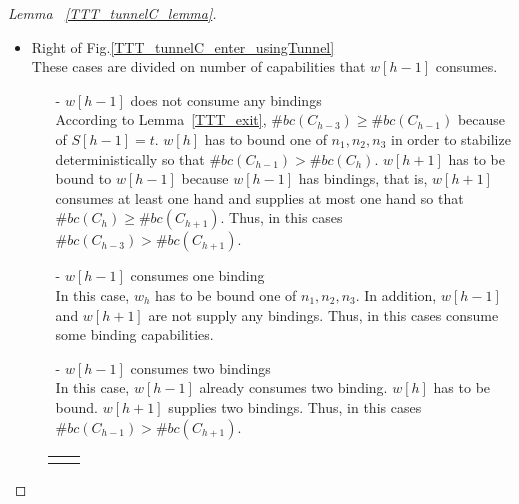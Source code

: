 \begin{proof}[Lemma~ \ref{TTT_tunnelC_lemma}]
\begin{itemize}
\item{Right of Fig.\ref{TTT_tunnelC_enter_usingTunnel}}\\
  These cases are divided on number of capabilities that $w[h-1]$ consumes.
  \begin{itemize}
  \item[-]{$w[h-1]$ does not consume any bindings}\\
  According to Lemma~\ref{TTT_exit}, $\#bc(C_{h-3}) \geq \#bc(C_{h-1})$ because of $S[h-1] = t$.
    $w[h]$ has to bound one of $n_1, n_2, n_3$ in order to stabilize deterministically so that  $\#bc(C_{h-1}) > \#bc(C_{h})$.
    $w[h+1]$ has to be bound to $w[h-1]$ because $w[h-1]$ has bindings, that is, $w[h+1]$ consumes at least one hand and supplies at most one hand so that $\#bc(C_{h}) \geq \#bc(C_{h+1})$. Thus, in this cases $\#bc(C_{h-3}) > \#bc(C_{h+1})$.

  \item[-]{$w[h-1]$ consumes one binding}\\
    In this case, $w_{h}$ has to be bound one of $n_1, n_2, n_3$. In addition, $w[h-1]$ and $w[h+1]$ are not supply any bindings. Thus, in this cases consume some binding capabilities.
  \item[-]{$w[h-1]$ consumes two bindings}\\
    In this case, $w[h-1]$ already consumes two binding. $w[h]$ has to be bound. $w[h+1]$ supplies two bindings. Thus, in this cases $\#bc(C_{h-1}) > \#bc(C_{h+1})$.
   
  \end{itemize}
\end{itemize}
\begin{figure}
  \centering
    \begin{tabular}{cc}
      
      \begin{minipage}{0.48\hsize}
      \centering
        \begin{tikzpicture}


\end{tikzpicture}
\end{minipage}
\end{tabular}
\end{figure}
\end{proof}
